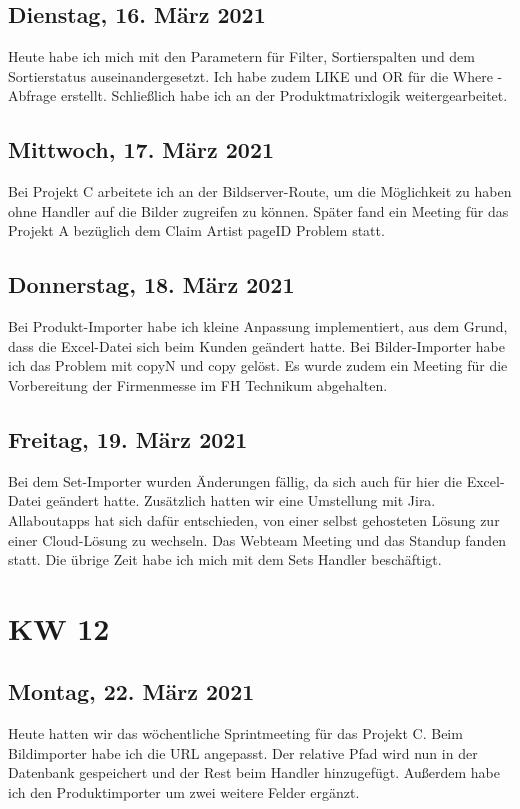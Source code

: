 \section{Dienstag, 16. März 2021}
Heute habe ich mich mit den Parametern für Filter, Sortierspalten und dem Sortierstatus auseinandergesetzt. Ich habe zudem \dq LIKE\dq{} und \dq OR\dq{} für die \dq Where\dq{} - Abfrage erstellt. Schließlich habe ich an der Produktmatrixlogik weitergearbeitet.

\section{Mittwoch, 17. März 2021}
Bei Projekt C arbeitete ich an der Bildserver-Route, um die Möglichkeit zu haben ohne Handler auf die Bilder zugreifen zu können. Später fand ein Meeting für das Projekt A bezüglich dem Claim Artist pageID Problem statt.

\section{Donnerstag, 18. März 2021}
Bei Produkt-Importer habe ich kleine Anpassung implementiert, aus dem Grund, dass die Excel-Datei sich beim Kunden geändert hatte. Bei Bilder-Importer habe ich das Problem mit copyN und copy gelöst. Es wurde zudem ein Meeting für die Vorbereitung der Firmenmesse im FH Technikum abgehalten.

\section{Freitag, 19. März 2021}
Bei dem Set-Importer wurden Änderungen fällig, da sich auch für hier die Excel-Datei geändert hatte. Zusätzlich hatten wir eine Umstellung mit Jira. Allaboutapps hat sich dafür entschieden, von einer selbst gehosteten Lösung zur einer Cloud-Lösung zu wechseln. Das Webteam Meeting und das Standup fanden statt. Die übrige Zeit habe ich mich mit dem Sets Handler beschäftigt.


\chapter{KW 12}

\section{Montag, 22. März 2021}
Heute hatten wir das wöchentliche Sprintmeeting für das Projekt C. Beim Bildimporter habe ich die URL angepasst. Der relative Pfad wird nun in der Datenbank gespeichert und der Rest beim Handler hinzugefügt. Außerdem habe ich den Produktimporter um zwei weitere Felder ergänzt.

